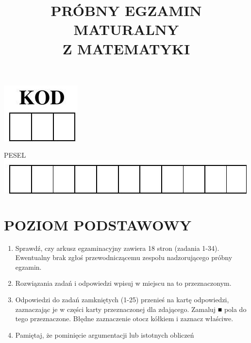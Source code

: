 \documentclass[10pt]{article}
\title{PRÓBNY EGZAMIN MATURALNY \\
 Z MATEMATYKI }
\author{}
\date{}
\begin{document}
\maketitle
\begin{center}
\includegraphics[max width=\textwidth]{2024_11_21_b8ac5f500a5bbb1b4ec5g-01(1)}
\end{center}

PESEL\\
\includegraphics[max width=\textwidth, center]{2024_11_21_b8ac5f500a5bbb1b4ec5g-01}

\section*{POZIOM PODSTAWOWY}
\begin{enumerate}
  \item Sprawdź, czy arkusz egzaminacyjny zawiera 18 stron (zadania 1-34). Ewentualny brak zgłoś przewodniczącemu zespołu nadzorującego próbny egzamin.
  \item Rozwiązania zadań i odpowiedzi wpisuj w miejscu na to przeznaczonym.
  \item Odpowiedzi do zadań zamkniętych (1-25) przenieś na kartę odpowiedzi, zaznaczając je w części karty przeznaczonej dla zdającego. Zamaluj ■ pola do tego przeznaczone. Błędne zaznaczenie otocz kółkiem i zaznacz właściwe.
  \item Pamiętaj, że pominięcie argumentacji lub istotnych obliczeń
\end{enumerate}
\end{document}
